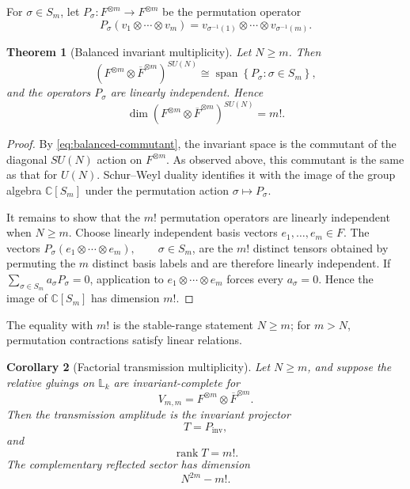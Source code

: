 \documentclass[11pt]{article}
\theoremstyle{plain}
\newtheorem{theorem}{Theorem}[section]
\newtheorem{corollary}[theorem]{Corollary}
\theoremstyle{definition}
\begin{document}
For
\(\sigma\in S_m\),
let \(P_\sigma: F^{\otimes m}\longrightarrow F^{\otimes m}\) be the permutation operator
\begin{equation}
\label{eq:permutation-operator}
P_\sigma
(v_1\otimes\cdots\otimes v_m)
=
v_{\sigma^{-1}(1)}
\otimes\cdots\otimes
v_{\sigma^{-1}(m)}.
\end{equation}

\begin{theorem}[Balanced invariant multiplicity]
\label{thm:balanced-invariant-multiplicity}
Let \(N\geq m\). Then
\begin{equation}
\label{eq:balanced-invariant-space}
\left(
F^{\otimes m}\otimes\overline F^{\otimes m}
\right)^{SU(N)}
\cong
\operatorname{span}
\left\{
P_\sigma:\sigma\in S_m
\right\},
\end{equation}
and the operators \(P_\sigma\) are linearly independent. Hence
\begin{equation}
\label{eq:factorial-multiplicity}
\dim
\left(
F^{\otimes m}\otimes\overline F^{\otimes m}
\right)^{SU(N)}
=
m!.
\end{equation}
\end{theorem}

\begin{proof}
By \eqref{eq:balanced-commutant}, the invariant space is the commutant of
the diagonal \(SU(N)\) action on \(F^{\otimes m}\). As observed above,
this commutant is the same as that for \(U(N)\). Schur--Weyl duality
identifies it with the image of the group algebra \(\mathbb C[S_m]\) under the permutation action \(\sigma\mapsto P_\sigma\).

It remains to show that the \(m!\) permutation operators are linearly
independent when \(N\geq m\). Choose linearly independent basis vectors
\(e_1,\ldots,e_m\in F\).
The vectors
\(P_\sigma (e_1\otimes\cdots\otimes e_m), \qquad \sigma\in S_m\),
are the \(m!\) distinct tensors obtained by permuting the \(m\) distinct
basis labels and are therefore linearly independent. If
\(\sum_{\sigma\in S_m}a_\sigma P_\sigma=0\),
application to \(e_1\otimes\cdots\otimes e_m\) forces every \(a_\sigma=0\). Hence the image of \(\mathbb C[S_m]\) has
dimension \(m!\).
\end{proof}

The equality with \(m!\) is the stable-range statement \(N\ge m\); for \(m>N\), permutation contractions satisfy linear relations.

\begin{corollary}[Factorial transmission multiplicity]
\label{cor:factorial-transmission}
Let \(N\geq m\), and suppose the relative gluings on \(\mathbb L_k\) are
invariant-complete for
\[
V_{m,m}
=
F^{\otimes m}\otimes\overline F^{\otimes m}.
\]
Then the transmission amplitude is the invariant projector
\[
T=P_{\mathrm{inv}},
\]
and
\begin{equation}
\label{eq:factorial-transmission-rank}
\operatorname{rank}T=m!.
\end{equation}
The complementary reflected sector has dimension
\[
N^{2m}-m!.
\]
\end{corollary}
\end{document}
